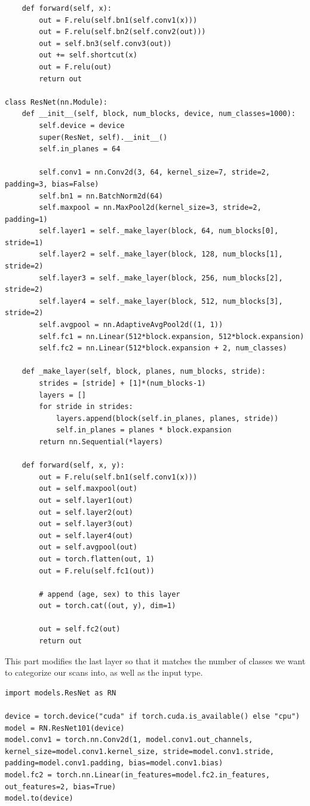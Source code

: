 \documentclass[a4paper, 12pt]{article}
\begin{document}
\begin{lstlisting}
    def forward(self, x):
        out = F.relu(self.bn1(self.conv1(x)))
        out = F.relu(self.bn2(self.conv2(out)))
        out = self.bn3(self.conv3(out))
        out += self.shortcut(x)
        out = F.relu(out)
        return out

class ResNet(nn.Module):
    def __init__(self, block, num_blocks, device, num_classes=1000):
        self.device = device
        super(ResNet, self).__init__()
        self.in_planes = 64

        self.conv1 = nn.Conv2d(3, 64, kernel_size=7, stride=2, padding=3, bias=False)
        self.bn1 = nn.BatchNorm2d(64)
        self.maxpool = nn.MaxPool2d(kernel_size=3, stride=2, padding=1)
        self.layer1 = self._make_layer(block, 64, num_blocks[0], stride=1)
        self.layer2 = self._make_layer(block, 128, num_blocks[1], stride=2)
        self.layer3 = self._make_layer(block, 256, num_blocks[2], stride=2)
        self.layer4 = self._make_layer(block, 512, num_blocks[3], stride=2)
        self.avgpool = nn.AdaptiveAvgPool2d((1, 1))
        self.fc1 = nn.Linear(512*block.expansion, 512*block.expansion)
        self.fc2 = nn.Linear(512*block.expansion + 2, num_classes)

    def _make_layer(self, block, planes, num_blocks, stride):
        strides = [stride] + [1]*(num_blocks-1)
        layers = []
        for stride in strides:
            layers.append(block(self.in_planes, planes, stride))
            self.in_planes = planes * block.expansion
        return nn.Sequential(*layers)

    def forward(self, x, y):
        out = F.relu(self.bn1(self.conv1(x)))
        out = self.maxpool(out)
        out = self.layer1(out)
        out = self.layer2(out)
        out = self.layer3(out)
        out = self.layer4(out)
        out = self.avgpool(out)
        out = torch.flatten(out, 1)
        out = F.relu(self.fc1(out))
        
        # append (age, sex) to this layer
        out = torch.cat((out, y), dim=1)

        out = self.fc2(out)
        return out
\end{lstlisting}

This part modifies the last layer so that it matches the number of classes we want to categorize our scans into, as well as the input type.
\begin{lstlisting}
import models.ResNet as RN

device = torch.device("cuda" if torch.cuda.is_available() else "cpu")
model = RN.ResNet101(device)
model.conv1 = torch.nn.Conv2d(1, model.conv1.out_channels, kernel_size=model.conv1.kernel_size, stride=model.conv1.stride, padding=model.conv1.padding, bias=model.conv1.bias)
model.fc2 = torch.nn.Linear(in_features=model.fc2.in_features, out_features=2, bias=True)
model.to(device)
\end{lstlisting}
\end{document}
